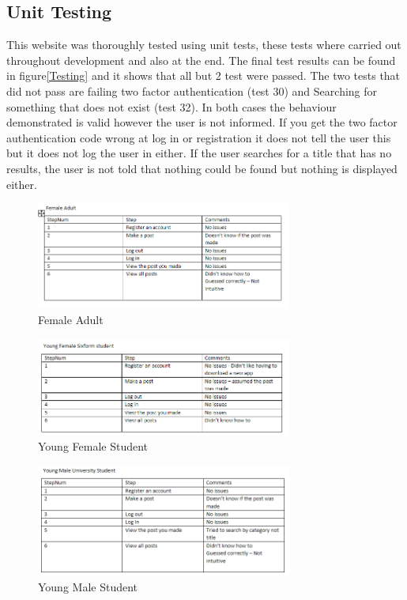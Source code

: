 \documentclass{cmpstyle}
\begin{document}
\subsection{Unit Testing}
This website was thoroughly tested using unit tests, these tests where carried out throughout development and also at the end. The final test results can be found in figure\ref{Testing} and it shows that all but 2 test were passed. The two tests that did not pass are failing two factor authentication (test 30) and Searching for something that does not exist (test 32). In both cases the behaviour demonstrated is valid however the user is not informed. If you get the two factor authentication code wrong at log in or registration it does not tell the user this but it does not log the user in either. If the user searches for a title that has no results, the user is not told that nothing could be found but nothing is displayed either.
\clearpage
\appendix
\begin{figure}[htb]
	\centering
	\includegraphics[width=0.75\textwidth]{Female.png}
	\caption{Female Adult \label{Female}}
\end{figure}
\begin{figure}[htb]
	\centering
	\includegraphics[width=0.75\textwidth]{Young female.png}
	\caption{Young Female Student \label{YFemale}}
\end{figure}
\begin{figure}[htb]
	\centering
	\includegraphics[width=0.75\textwidth]{Young male.png}
	\caption{Young Male Student \label{YMale}}
\end{figure}
\end{document}
